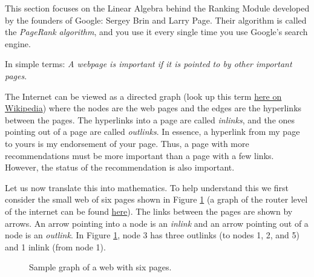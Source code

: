 This section focuses on the Linear Algebra behind the Ranking Module developed by the
founders of Google: Sergey Brin and Larry Page.  Their algorithm is called the
\emph{PageRank algorithm}, and you use it every single time you use Google's search
engine.


In simple terms: {\it A webpage is important if it is pointed to by other important
pages}.

The Internet can be viewed as a directed graph (look up this term
\href{https://en.wikipedia.org/wiki/Directed_graph}{here on Wikipedia}) where the nodes
are the web pages and the edges are the hyperlinks between the pages. The hyperlinks into a
page are called {\it inlinks}, and the ones pointing out of a page are called {\it
outlinks}.  In essence, a hyperlink from my page to yours is my endorsement of your page.
Thus, a page with more recommendations must be more important than a page with a few
links.  However, the status of the recommendation is also important. 

Let us now translate this into mathematics. To help understand
this we first consider the small web of six pages shown in Figure
\ref{fig:example_graph} (a graph of the router level of the internet can be found
\href{https://personalpages.manchester.ac.uk/staff/m.dodge/cybergeography/atlas/lumeta_large.jpg}{here}).  The links between the
pages are shown by arrows. An arrow pointing into a node is an {\it inlink}
and an arrow pointing out of a node is an {\it outlink}. In Figure
\ref{fig:example_graph}, node 3 has three outlinks (to nodes 1, 2, and 5)
and 1 inlink (from node 1).

\begin{figure}[ht]
    \begin{center}
    \end{center}
        \caption{Sample graph of a web with six pages.}
        \label{fig:example_graph}
\end{figure}

